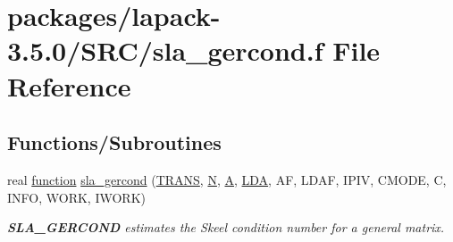 \hypertarget{sla__gercond_8f}{}\section{packages/lapack-\/3.5.0/\+S\+R\+C/sla\+\_\+gercond.f File Reference}
\label{sla__gercond_8f}
\subsection*{Functions/\+Subroutines}
\begin{DoxyCompactItemize}
\item 
real \hyperlink{afunc_8m_a7b5e596df91eadea6c537c0825e894a7}{function} \hyperlink{group__realGEcomputational_ga0249e1294da0f1991fd57246a8694070}{sla\+\_\+gercond} (\hyperlink{superlu__enum__consts_8h_a0c4e17b2d5cea33f9991ccc6a6678d62a1f61e3015bfe0f0c2c3fda4c5a0cdf58}{T\+R\+A\+N\+S}, \hyperlink{polmisc_8c_a0240ac851181b84ac374872dc5434ee4}{N}, \hyperlink{classA}{A}, \hyperlink{example__user_8c_ae946da542ce0db94dced19b2ecefd1aa}{L\+D\+A}, A\+F, L\+D\+A\+F, I\+P\+I\+V, C\+M\+O\+D\+E, C, I\+N\+F\+O, W\+O\+R\+K, I\+W\+O\+R\+K)
\begin{DoxyCompactList}\small\item\em {\bfseries S\+L\+A\+\_\+\+G\+E\+R\+C\+O\+N\+D} estimates the Skeel condition number for a general matrix. \end{DoxyCompactList}\end{DoxyCompactItemize}

